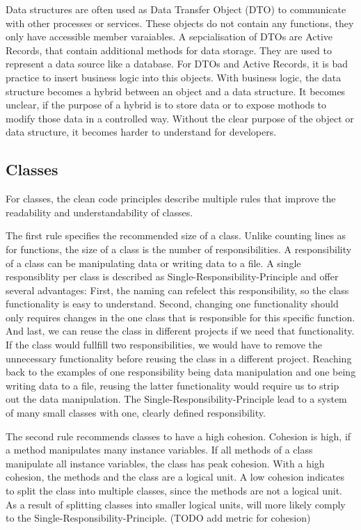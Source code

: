 Data structures are often used as Data Transfer Object (DTO) to communicate with other processes or services. These objects do not contain any functions, they only have accessible member varaiables. A sepcialisation of DTOs are Active Records, that contain additional methods for data storage. They are used to represent a data source like a database. For DTOs and Active Records, it is bad practice to insert business logic into this objects\cite{martin_clean_2009}. With business logic, the data structure becomes a hybrid between an object and a data structure. It becomes unclear, if the purpose of a hybrid is to store data or to expose mothods to modify those data in a controlled way. Without the clear purpose of the object or data structure, it becomes harder to understand for developers.


\subsection{Classes}\label{sec:classes}
For classes, the clean code principles describe multiple rules that improve the readability and understandability of classes.

The first rule specifies the recommended size of a class. Unlike counting lines as for functions, the size of a class is the number of responsibilities. A responsibility of a class can be manipulating data or writing data to a file. A single responsiblity per class is described as Single-Responsibility-Principle and offer several advantages: First, the naming can refelect this responsibility, so the class functionality is easy to understand.
Second, changing one functionality should only requires changes in the one class that is responsible for this specific function. And last, we can reuse the class in different projects if we need that functionality. If the class would fullfill two responsibilities, we would have to remove the unnecessary functionality before reusing the class in a different project. Reaching back to the examples of one responsibility being data manipulation and one being writing data to a file, reusing the latter functionality would require us to strip out the data manipulation.
The Single-Responsibility-Principle lead to a system of many small classes with one, clearly defined responsibility.

The second rule recommends classes to have a high cohesion. Cohesion is high, if a method manipulates many instance variables. If all methods of a class manipulate all instance variables, the class has peak cohesion. With a high cohesion, the methods and the class are a logical unit. A low cohesion indicates to split the class into multiple classes, since the methods are not a logical unit. As a result of splitting classes into smaller logical units, will more likely comply to the Single-Responsibility-Principle. (TODO add metric for cohesion)

